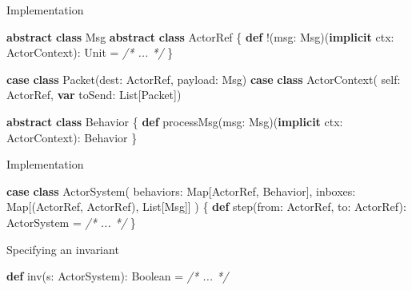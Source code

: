 \documentclass[ignorenonframetext,]{beamer}
\newenvironment{Shaded}{}{}
\newcommand{\CommentTok}[1]{\textcolor[rgb]{0.38,0.63,0.69}{\textit{#1}}}
\newcommand{\FunctionTok}[1]{\textcolor[rgb]{0.02,0.16,0.49}{#1}}
\newcommand{\KeywordTok}[1]{\textcolor[rgb]{0.00,0.44,0.13}{\textbf{#1}}}
\newcommand{\NormalTok}[1]{#1}
\begin{document}
\begin{frame}[fragile]{%
\protect\hypertarget{implementation-1}{%
Implementation}}

\begin{Shaded}
\begin{Highlighting}[]
\KeywordTok{abstract} \KeywordTok{class}\NormalTok{ Msg}
\KeywordTok{abstract} \KeywordTok{class}\NormalTok{ ActorRef \{}
  \KeywordTok{def}\NormalTok{ !(msg: Msg)(}\KeywordTok{implicit}\NormalTok{ ctx: ActorContext): Unit = }\CommentTok{/* ... */}
\NormalTok{\}}

\KeywordTok{case} \KeywordTok{class} \FunctionTok{Packet}\NormalTok{(dest: ActorRef, payload: Msg)}
\KeywordTok{case} \KeywordTok{class} \FunctionTok{ActorContext}\NormalTok{( self: ActorRef, }\KeywordTok{var}\NormalTok{ toSend: List[Packet])}

\KeywordTok{abstract} \KeywordTok{class}\NormalTok{ Behavior \{}
  \KeywordTok{def} \FunctionTok{processMsg}\NormalTok{(msg: Msg)(}\KeywordTok{implicit}\NormalTok{ ctx: ActorContext): Behavior}
\NormalTok{\}}
\end{Highlighting}
\end{Shaded}

\end{frame}

\begin{frame}[fragile]{%
\protect\hypertarget{implementation-2}{%
Implementation}}

\begin{Shaded}
\begin{Highlighting}[]
\KeywordTok{case} \KeywordTok{class} \FunctionTok{ActorSystem}\NormalTok{(}
\NormalTok{  behaviors: Map[ActorRef, Behavior],}
\NormalTok{  inboxes: Map[(ActorRef, ActorRef), List[Msg]]}
\NormalTok{) \{}
  \KeywordTok{def} \FunctionTok{step}\NormalTok{(from: ActorRef, to: ActorRef): ActorSystem = }\CommentTok{/* ... */}
\NormalTok{\}}
\end{Highlighting}
\end{Shaded}

\end{frame}

\begin{frame}[fragile]{%
\protect\hypertarget{specifying-an-invariant}{%
Specifying an invariant}}

\begin{Shaded}
\begin{Highlighting}[]
\KeywordTok{def} \FunctionTok{inv}\NormalTok{(s: ActorSystem): Boolean = }\CommentTok{/* ... */}
\end{Highlighting}
\end{Shaded}

\end{frame}
\end{document}
